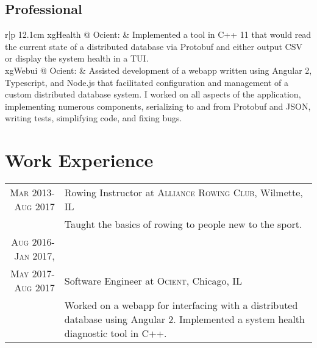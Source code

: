\documentclass[a4paper,10pt]{article} %
\begin{document}
\subsection{Professional}
\begin{tabular}{r|p {12.1cm}}
    xgHealth @ Ocient: & Implemented a tool in C++ 11 that would read the current state of a distributed database via Protobuf and either output CSV or display the system health in a TUI.\\ 
    xgWebui @ Ocient: & Assisted development of a webapp written using Angular 2, Typescript, and Node.js that facilitated configuration and management of a custom distributed database system. I worked on all aspects of the application, implementing numerous components, serializing to and from Protobuf and JSON, writing tests, simplifying code, and fixing bugs.


\end{tabular}

\section{Work Experience}

\begin{tabular}{r|p{11cm}}

\textsc{Mar 2013-Aug 2017} & Rowing Instructor at \textsc{Alliance Rowing Club}, Wilmette, IL \emph{}\\
& \footnotesize{Taught the basics of rowing to people new to the sport.} \\

    \textsc{Aug 2016-Jan 2017,}\\ \textsc{May 2017-Aug 2017} & Software Engineer at \textsc{Ocient}, Chicago, IL \emph{} \\
& \footnotesize{Worked on a webapp for interfacing with a distributed database using Angular 2. Implemented a system health diagnostic tool in C++. }
\end{tabular}






\end{document}
